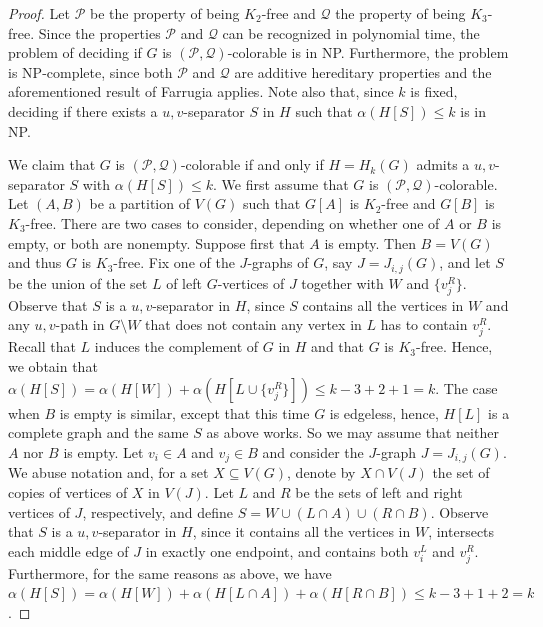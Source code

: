 \documentclass[11pt]{article}
\theoremstyle{definition}
\newcommand{\NP}{\textup{\textsf{NP}}}
\begin{document}
\begin{proof}
Let $\mathcal{P}$ be the property of being $K_2$-free and $\mathcal{Q}$ the property of being $K_3$-free.
Since the properties $\mathcal{P}$ and $\mathcal{Q}$ can be recognized in polynomial time, the problem of deciding if $G$ is $(\mathcal{P},\mathcal{Q})$-colorable is in \NP.
Furthermore, the problem is \NP-complete, since both $\mathcal{P}$ and $\mathcal{Q}$ are additive hereditary properties and the aforementioned result of Farrugia \cite{MR2097312} applies.
Note also that, since $k$ is fixed, deciding if there exists a $u{,}v$-separator $S$ in $H$ such that $\alpha(H[S]) \leq k$ is in \NP.

We claim that $G$ is $(\mathcal{P},\mathcal{Q})$-colorable if and only if $H = H_k(G)$ admits a $u{,}v$-separator $S$ with $\alpha(H[S]) \leq k$.
We first assume that $G$ is $(\mathcal{P},\mathcal{Q})$-colorable.
Let $(A,B)$ be a partition of $V(G)$ such that $G[A]$ is $K_2$-free and $G[B]$ is $K_3$-free.
There are two cases to consider, depending on whether one of $A$ or $B$ is empty, or both are nonempty.
Suppose first that $A$ is empty.
Then $B= V(G)$ and thus $G$ is $K_3$-free.
Fix one of the $J$-graphs of $G$, say $J = J_{i,j}(G)$, and let $S$ be the union of the set $L$ of left $G$-vertices of $J$ together with $W$ and $\{v_j^R\}$.
Observe that $S$ is a $u{,}v$-separator in $H$, since $S$ contains all the vertices in $W$ and any $u{,}v$-path in $G \setminus W$ that does not contain any vertex in $L$ has to contain $v_j^R$.
Recall that $L$ induces the complement of $G$ in $H$ and that $G$ is $K_3$-free.
Hence, we obtain that $\alpha(H[S]) = \alpha(H[W]) + \alpha(H[L \cup \{v_j^R\}]) \leq k-3+2+1 = k$.
The case when $B$ is empty is similar, except that this time $G$ is edgeless, hence, $H[L]$ is a complete graph and the same $S$ as above works.
So we may assume that neither $A$ nor $B$ is empty.
Let $v_i \in A$ and $v_j \in B$ and consider the $J$-graph $J = J_{i,j}(G)$.
We abuse notation and, for a set $X \subseteq V(G)$, denote by $X \cap V(J)$ the set of copies of vertices of $X$ in $V(J)$.
Let $L$ and $R$ be the sets of left and right vertices of $J$, respectively, and define $S = W \cup (L \cap A) \cup (R \cap B)$.
Observe that $S$ is a $u{,}v$-separator in $H$, since it contains all the vertices in $W$, intersects each middle edge of $J$ in exactly one endpoint, and contains both $v_i^L$ and $v_j^R$.
Furthermore, for the same reasons as above, we have $\alpha(H[S]) = \alpha(H[W]) + \alpha(H[L \cap A]) + \alpha(H[R \cap B]) \leq k-3 + 1 + 2 = k$.


\end{proof}
\end{document}
